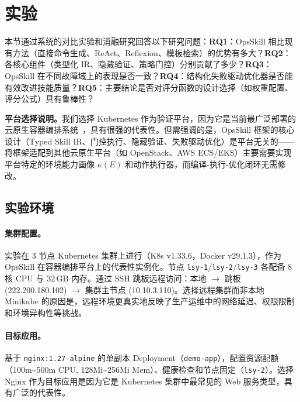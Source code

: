 \documentclass[11pt,a4paper]{ctexart}
\begin{document}
\section{实验}

本节通过系统的对比实验和消融研究回答以下研究问题：\textbf{RQ1}：OpsSkill 相比现有方法（直接命令生成、ReAct、Reflexion、模板检索）的优势有多大？\textbf{RQ2}：各核心组件（类型化 IR、隐藏验证、策略门控）分别贡献了多少？\textbf{RQ3}：OpsSkill 在不同故障域上的表现是否一致？\textbf{RQ4}：结构化失败驱动优化器是否能有效改进技能质量？\textbf{RQ5}：主要结论是否对评分函数的设计选择（如权重配置、评分公式）具有鲁棒性？

\noindent\textbf{平台选择说明。}我们选择 Kubernetes 作为验证平台，因为它是当前最广泛部署的云原生容器编排系统~\cite{burns2022kubernetes}，具有很强的代表性。但需强调的是，OpsSkill 框架的核心设计（Typed Skill IR、门控执行、隐藏验证、失败驱动优化）是平台无关的——将框架适配到其他云原生平台（如 OpenStack、AWS ECS/EKS）主要需要实现平台特定的环境能力画像 $\kappa(E)$ 和动作执行器，而编译-执行-优化闭环无需修改。

\subsection{实验环境}

\paragraph{集群配置。}
实验在 3 节点 Kubernetes 集群上进行（K8s v1.33.6，Docker v29.1.3），作为 OpsSkill 在容器编排平台上的代表性实例化。节点 \texttt{lsy-1}/\texttt{lsy-2}/\texttt{lsy-3} 各配备 8 核 CPU 与 32\,GB 内存。通过 SSH 跳板远程访问：本地 $\to$ 跳板 (222.200.180.102) $\to$ 集群主节点 (10.10.3.110)。选择远程集群而非本地 Minikube 的原因是，远程环境更真实地反映了生产运维中的网络延迟、权限限制和环境异构性等挑战。

\paragraph{目标应用。}
基于 \texttt{nginx:1.27-alpine} 的单副本 Deployment（\texttt{demo-app}），配置资源配额（100m\textasciitilde500m CPU, 128Mi\textasciitilde256Mi Mem）、健康检查和节点固定（\texttt{lsy-2}）。选择 Nginx 作为目标应用是因为它是 Kubernetes 集群中最常见的 Web 服务类型，具有广泛的代表性。
\end{document}
